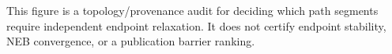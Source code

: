 This figure is a topology/provenance audit for deciding which path segments require independent endpoint relaxation. It does not certify endpoint stability, NEB convergence, or a publication barrier ranking.
